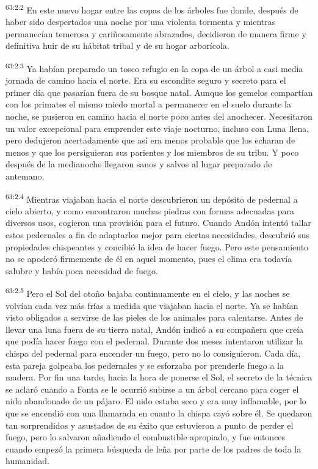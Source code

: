 \par
\textsuperscript{63:2.2} En este nuevo hogar entre las copas de los árboles fue donde, después de haber sido despertados una noche por una violenta tormenta y mientras permanecían temerosa y cariñosamente abrazados, decidieron de manera firme y definitiva huir de su hábitat tribal y de su hogar arborícola.

\par
\textsuperscript{63:2.3} Ya habían preparado un tosco refugio en la copa de un árbol a casi media jornada de camino hacia el norte. Era su escondite seguro y secreto para el primer día que pasarían fuera de su bosque natal. Aunque los gemelos compartían con los primates el mismo miedo mortal a permanecer en el suelo durante la noche, se pusieron en camino hacia el norte poco antes del anochecer. Necesitaron un valor excepcional para emprender este viaje nocturno, incluso con Luna llena, pero dedujeron acertadamente que así era menos probable que los echaran de menos y que los persiguieran sus parientes y los miembros de su tribu. Y poco después de la medianoche llegaron sanos y salvos al lugar preparado de antemano.

\par
\textsuperscript{63:2.4} Mientras viajaban hacia el norte descubrieron un depósito de pedernal a cielo abierto, y como encontraron muchas piedras con formas adecuadas para diversos usos, cogieron una provisión para el futuro. Cuando Andón intentó tallar estos pedernales a fin de adaptarlos mejor para ciertas necesidades, descubrió sus propiedades chispeantes y concibió la idea de hacer fuego. Pero este pensamiento no se apoderó firmemente de él en aquel momento, pues el clima era todavía salubre y había poca necesidad de fuego.

\par
\textsuperscript{63:2.5} Pero el Sol del otoño bajaba continuamente en el cielo, y las noches se volvían cada vez más frías a medida que viajaban hacia el norte. Ya se habían visto obligados a servirse de las pieles de los animales para calentarse. Antes de llevar una luna fuera de su tierra natal, Andón indicó a su compañera que creía que podía hacer fuego con el pedernal. Durante dos meses intentaron utilizar la chispa del pedernal para encender un fuego, pero no lo consiguieron. Cada día, esta pareja golpeaba los pedernales y se esforzaba por prenderle fuego a la madera. Por fin una tarde, hacia la hora de ponerse el Sol, el secreto de la técnica se aclaró cuando a Fonta se le ocurrió subirse a un árbol cercano para coger el nido abandonado de un pájaro. El nido estaba seco y era muy inflamable, por lo que se encendió con una llamarada en cuanto la chispa cayó sobre él. Se quedaron tan sorprendidos y asustados de su éxito que estuvieron a punto de perder el fuego, pero lo salvaron añadiendo el combustible apropiado, y fue entonces cuando empezó la primera búsqueda de leña por parte de los padres de toda la humanidad.


